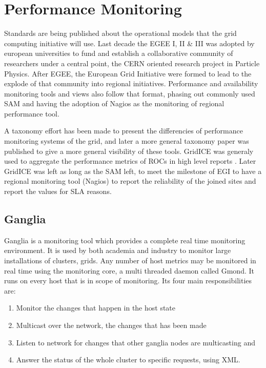 \section{Performance Monitoring}
Standards are being published about the operational models that the grid computing initiative will use. Last decade the EGEE I, II \& III was adopted by european universities to fund and establish a collaborative community of researchers under a central point, the CERN oriented research project in Particle Physics. After EGEE, the European Grid Initiative were formed to lead to the explode of that community into regional initiatives. Performance and availability monitoring tools and views also follow that format, phasing out commonly used SAM \cite{egee3dsa122} and having the adoption of Nagios as the monitoring of regional performance tool.


A taxonomy effort has been made \cite{gerndt2004performance} to present the differencies of performance monitoring systems of the grid, and later a more general \cite{zanikolas2007importance} taxonomy paper was published to give a more general visibility of these tools. GridICE was generaly used to aggregate the performance metrics of ROCs in high level reports \cite{andreozzi2005gridice}. Later GridICE was left as long as the SAM left, to meet the milestone of EGI to have a regional monitoring tool (Nagios) to report the reliability of the joined sites and report the values for SLA reasons.

\subsection{Ganglia}

Ganglia is a monitoring tool which provides a complete real time monitoring environment. It is used by both academia and industry to monitor large installations of clusters, grids. Any number of host metrics may be monitored in real time using the monitoring core, a multi threaded daemon called Gmond. It runs on every host that is in scope of monitoring. Its four main responsibilities are:

\begin{enumerate}
\item Monitor the changes that happen in the host state
\item Multicast over the network, the changes that has been made
\item Listen to network for changes that other ganglia nodes are multicasting and
\item Answer the status of the whole cluster to specific requests, using XML.
\end{enumerate}

